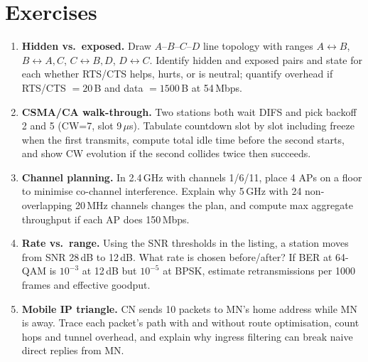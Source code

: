 \section{Exercises}\label{sec:ch07-exercises}
\begin{enumerate}[label=E7.\arabic*, leftmargin=*, itemsep=0.8em]
    \item \textbf{Hidden vs.\ exposed.} Draw $A$--$B$--$C$--$D$ line topology with ranges $A\leftrightarrow B$, $B\leftrightarrow A,C$, $C\leftrightarrow B,D$, $D\leftrightarrow C$. Identify hidden and exposed pairs and state for each whether RTS/CTS helps, hurts, or is neutral; quantify overhead if RTS/CTS $=20$\,B and data $=1500$\,B at 54\,Mbps.
    \item \textbf{CSMA/CA walk-through.} Two stations both wait DIFS and pick backoff 2 and 5 (CW=7, slot 9\,$\mu$s). Tabulate countdown slot by slot including freeze when the first transmits, compute total idle time before the second starts, and show CW evolution if the second collides twice then succeeds.
    \item \textbf{Channel planning.} In 2.4\,GHz with channels 1/6/11, place 4 APs on a floor to minimise co-channel interference. Explain why 5\,GHz with 24 non-overlapping 20\,MHz channels changes the plan, and compute max aggregate throughput if each AP does 150\,Mbps.
    \item \textbf{Rate vs.\ range.} Using the SNR thresholds in the listing, a station moves from SNR 28\,dB to 12\,dB. What rate is chosen before/after? If BER at 64-QAM is $10^{-3}$ at 12\,dB but $10^{-5}$ at BPSK, estimate retransmissions per 1000 frames and effective goodput.
    \item \textbf{Mobile IP triangle.} CN sends 10 packets to MN's home address while MN is away. Trace each packet's path with and without route optimisation, count hops and tunnel overhead, and explain why ingress filtering can break naive direct replies from MN.
\end{enumerate}
